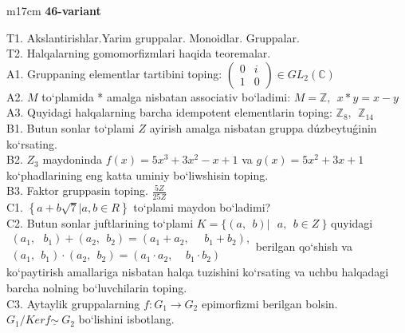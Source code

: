 \documentclass{article}
\begin{document}
\begin{tabular}{m{17cm}}
\textbf{46-variant}
\newline

T1. Akslantirishlar.Yarim gruppalar. Monoidlar. Gruppalar. \\
T2. Halqalarning gomomorfizmlari haqida teoremalar. \\
A1. Gruppaning elementlar tartibini toping: \(\begin{pmatrix}
0 & i \\
1 & 0
\end{pmatrix} \in GL_{2}(\mathbb{C})\) \\
A2. \(M\) to`plamida * amalga nisbatan associativ bo`ladimi: \(M\mathbb{= Z},\ \ x*y = x - y\) \\
A3. Quyidagi halqalarning barcha idempotent elementlarin toping: \(\mathbb{Z}_{8},\ \ \mathbb{Z}_{14}\) \\
B1. Butun sonlar to`plami \(Z\) ayirish amalga nisbatan gruppa dúzbeytuǵinin ko`rsating. \\
B2. \(Z_{3}\) maydoninda \(f(x) = 5x^{3} + 3x^{2} - x + 1\) va \(g(x) = 5x^{2} + 3x + 1\) ko`phadlarining eng katta uminiy bo`liwshisin toping. \\
B3. Faktor gruppasin toping. \(\frac{5Z}{25Z}\) \\
C1. \(\left\{ a + b\sqrt{7}|a,b \in R \right\}\) to`plami maydon bo`ladimi? \\
C2. Butun sonlar juftlarining to`plami \(K = \{(a,\ \ b)\left| \ \ \ a,\ \ b \in Z \right.\ \}\) quyidagi \(\begin{matrix}
(a_{1},\ \ \ b_{1}) + (a_{2},\ \ b_{2}) = (a_{1} + a_{2},\ \ \ \ \ \ b_{1} + b_{2}), \\
(a_{1},\ \ b_{1}) \cdot (a_{2},\ \ b_{2}) = (a_{1} \cdot a_{2},\ \ \ \ \ b_{1} \cdot b_{2})
\end{matrix}\)berilgan qo`shish va ko`paytirish amallariga nisbatan halqa tuzishini ko`rsating va uchbu halqadagi barcha nolning bo`luvchilarin toping. \\
C3. Aytaylik gruppalarning \(f:G_{1} \rightarrow G_{2}\) epimorfizmi berilgan bo\textquotesingle lsin. \(G_{1}/Kerf\underline{\sim}\ G_{2}\) bo`lishini isbotlang. \\

\end{tabular}
\vspace{1cm}
\end{document}
